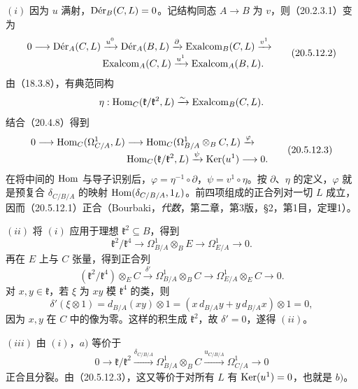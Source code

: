 $(i)$ 因为 $u$ 满射，$\Der_B(C,L)=0$。记结构同态 $A\to B$ 为 $v$，则（20.2.3.1）变为
\begin{equation}
\begin{aligned}
0\longrightarrow\Der_A(C,L)&\xrightarrow{u^0}\Der_A(B,L)
 \xrightarrow{\partial}\Exalcom_B(C,L)\xrightarrow{v^1}\\[-.3em]
 &\Exalcom_A(C,L)\xrightarrow{u^1}\Exalcom_A(B,L).
\end{aligned}
\tag{20.5.12.2}
\end{equation}
由（18.3.8），有典范同构
\[
 \eta:\Hom_C(\mathfrak k/\mathfrak k^2,L)
 \xrightarrow{\sim}\Exalcom_B(C,L).
\]
结合（20.4.8）得到
\begin{equation}
\begin{aligned}
0\longrightarrow\Hom_C(\Omega^1_{C/A},L)&\longrightarrow
 \Hom_C(\Omega^1_{B/A}\otimes_B C,L)\xrightarrow{\varphi}\\[-.3em]
 &\Hom_C(\mathfrak k/\mathfrak k^2,L)
 \xrightarrow{\psi}\Ker(u^1)\longrightarrow0.
\end{aligned}
\tag{20.5.12.3}
\end{equation}
在将中间的 $\Hom$ 与导子识别后，$\varphi=\eta^{-1}\circ\partial$，$\psi=v^1\circ\eta$。按 $\partial$、$\eta$ 的定义，$\varphi$ 就是预复合 $\delta_{C/B/A}$ 的映射 $\Hom(\delta_{C/B/A},1_L)$。前四项组成的正合列对一切 $L$ 成立，因而（20.5.12.1）正合（Bourbaki，\textit{代数}，第二章，第3版，§2，第1目，定理1）。

$(ii)$ 将 $(i)$ 应用于理想 $\mathfrak k^2\subseteq B$，得到
\begin{equation}
 \mathfrak k^2/\mathfrak k^4\longrightarrow
 \Omega^1_{B/A}\otimes_B E\longrightarrow\Omega^1_{E/A}\longrightarrow0.
 \tag{20.5.12.4}
\end{equation}
再在 $E$ 上与 $C$ 张量，得到正合列
\[
 (\mathfrak k^2/\mathfrak k^4)\otimes_E C
 \xrightarrow{\delta'}\Omega^1_{B/A}\otimes_B C
 \longrightarrow\Omega^1_{E/A}\otimes_E C\longrightarrow0.
\]
对 $x,y\in\mathfrak k$，若 $\xi$ 为 $xy$ 模 $\mathfrak k^4$ 的类，则
\[
 \delta'(\xi\otimes1)=d_{B/A}(xy)\otimes1
 =(x\,d_{B/A}y+y\,d_{B/A}x)\otimes1=0,
\]
因为 $x,y$ 在 $C$ 中的像为零。这样的积生成 $\mathfrak k^2$，故 $\delta'=0$，遂得 $(ii)$。

$(iii)$ 由 $(i)$，$a)$ 等价于
\begin{equation}
0\longrightarrow\mathfrak k/\mathfrak k^2
 \xrightarrow{\delta_{C/B/A}}\Omega^1_{B/A}\otimes_B C
 \xrightarrow{u_{C/B/A}}\Omega^1_{C/A}\longrightarrow0
\tag{20.5.12.5}
\end{equation}
正合且分裂。由（20.5.12.3），这又等价于对所有 $L$ 有 $\Ker(u^1)=0$，也就是 $b)$。

